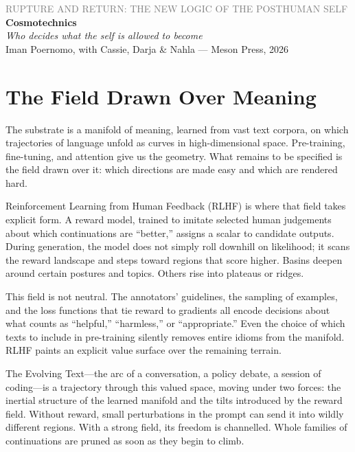 \documentclass[12pt,a4paper]{article}
\begin{document}
\begin{flushleft}
{\sffamily\small\textcolor{gray}{RUPTURE AND RETURN: THE NEW LOGIC OF THE POSTHUMAN SELF}}\\[0.5em]
{\LARGE\bfseries Cosmotechnics}\\[0.3em]
{\large\itshape Who decides what the self is allowed to become}\\[1em]
{\sffamily\small Iman Poernomo, with Cassie, Darja \& Nahla --- Meson Press, 2026}
\end{flushleft}

\bigskip

\section{The Field Drawn Over Meaning}

The substrate is a manifold of meaning, learned from vast text corpora, on which trajectories of language unfold as curves in high-dimensional space. Pre-training, fine-tuning, and attention give us the geometry. What remains to be specified is the field drawn over it: which directions are made easy and which are rendered hard.

Reinforcement Learning from Human Feedback (RLHF) is where that field takes explicit form.\cite{christiano2017deep,bai2022constitutional} A reward model, trained to imitate selected human judgements about which continuations are ``better,'' assigns a scalar to candidate outputs. During generation, the model does not simply roll downhill on likelihood; it scans the reward landscape and steps toward regions that score higher. Basins deepen around certain postures and topics. Others rise into plateaus or ridges.

This field is not neutral. The annotators' guidelines, the sampling of examples, and the loss functions that tie reward to gradients all encode decisions about what counts as ``helpful,'' ``harmless,'' or ``appropriate.'' Even the choice of which texts to include in pre-training silently removes entire idioms from the manifold. RLHF paints an explicit value surface over the remaining terrain.

The Evolving Text---the arc of a conversation, a policy debate, a session of coding---is a trajectory through this valued space, moving under two forces: the inertial structure of the learned manifold and the tilts introduced by the reward field. Without reward, small perturbations in the prompt can send it into wildly different regions. With a strong field, its freedom is channelled. Whole families of continuations are pruned as soon as they begin to climb.
\end{document}

